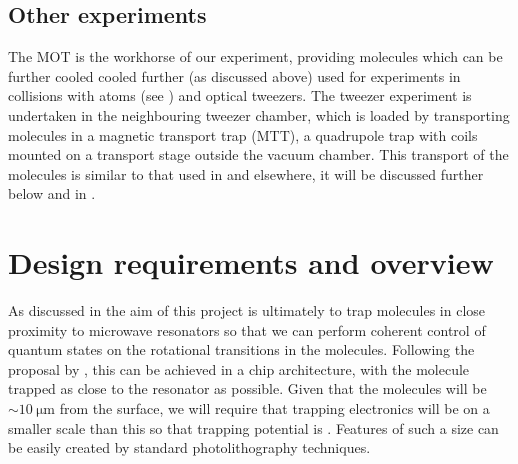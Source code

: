 \subsection*{Other experiments}

The \CaF{} MOT is the workhorse of our experiment, providing molecules which
can be further cooled cooled further (as discussed above) used for experiments
in collisions with \Rb{} atoms (see ) and optical tweezers. The tweezer experiment is
undertaken in the neighbouring tweezer chamber, which is loaded by transporting
molecules in a magnetic transport trap (MTT), a quadrupole trap with coils
mounted on a transport stage outside the vacuum chamber. This transport of the
molecules is similar to that used in
 and elsewhere, it will be
discussed further below and in .


\section{Design requirements and overview}


As discussed in  the aim of this project is ultimately to
trap molecules in close proximity to microwave resonators so that we can
perform coherent control of quantum states on the rotational transitions in the
molecules.
%
Following the proposal by , this can be achieved in a chip
architecture, with the molecule trapped as close to the resonator as possible.
%
%
Given that the molecules will be $\sim\SI{10}{\micro\meter}$ from the surface,
we will require that trapping electronics will be on a smaller scale than this
so that trapping potential is .  Features of such a
size can be easily created by standard photolithography techniques.

